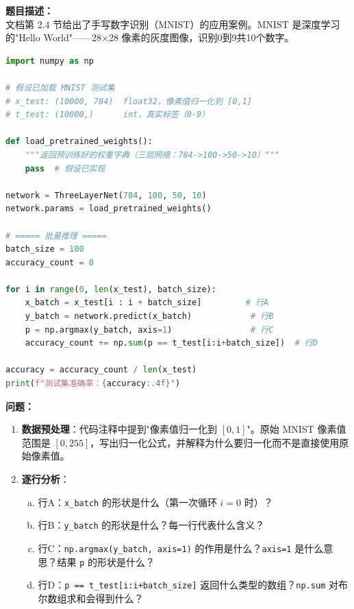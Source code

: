 \documentclass[a4paper,11pt]{ctexart}
\begin{document}
\begin{problembox}
    \textbf{题目描述：}\\
    文档第 2.4 节给出了手写数字识别（MNIST）的应用案例。MNIST 是深度学习的"Hello World"——28$\times$28 像素的灰度图像，识别0到9共10个数字。

    \begin{lstlisting}[language=Python]
import numpy as np

# 假设已加载 MNIST 测试集
# x_test: (10000, 784)  float32，像素值归一化到 [0,1]
# t_test: (10000,)      int，真实标签（0-9）

def load_pretrained_weights():
    """返回预训练好的权重字典（三层网络：784->100->50->10）"""
    pass  # 假设已实现

network = ThreeLayerNet(784, 100, 50, 10)
network.params = load_pretrained_weights()

# ===== 批量推理 =====
batch_size = 100
accuracy_count = 0

for i in range(0, len(x_test), batch_size):
    x_batch = x_test[i : i + batch_size]         # 行A
    y_batch = network.predict(x_batch)            # 行B
    p = np.argmax(y_batch, axis=1)                # 行C
    accuracy_count += np.sum(p == t_test[i:i+batch_size])  # 行D

accuracy = accuracy_count / len(x_test)
print(f"测试集准确率：{accuracy:.4f}")
    \end{lstlisting}

    \textbf{问题：}
    \begin{enumerate}[(1)]
        \item \textbf{数据预处理}：代码注释中提到"像素值归一化到 $[0,1]$"。原始 MNIST 像素值范围是 $[0, 255]$，写出归一化公式，并解释为什么要归一化而不是直接使用原始像素值。

        \item \textbf{逐行分析}：
        \begin{enumerate}[a.]
            \item 行A：\texttt{x\_batch} 的形状是什么（第一次循环 $i=0$ 时）？
            \item 行B：\texttt{y\_batch} 的形状是什么？每一行代表什么含义？
            \item 行C：\texttt{np.argmax(y\_batch, axis=1)} 的作用是什么？\texttt{axis=1} 是什么意思？结果 \texttt{p} 的形状是什么？
            \item 行D：\texttt{p == t\_test[i:i+batch\_size]} 返回什么类型的数组？\texttt{np.sum} 对布尔数组求和会得到什么？
        \end{enumerate}


\end{enumerate}
\end{problembox}
\end{document}
